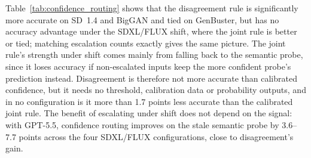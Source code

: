 \documentclass{ieeeaccess}
\begin{document}
\begin{table}[h]
\centering
\footnotesize
\setlength{\tabcolsep}{2pt}
\caption{Disagreement versus joint confidence routing: accuracy (escalation rate). $\Delta$: confidence minus disagreement, with 95\% CI; $^\ast$ CI excludes zero.}
\label{tab:confidence_routing}
\end{table}

Table~\ref{tab:confidence_routing} shows that the disagreement rule is significantly more accurate on SD~1.4 and BigGAN and tied on GenBuster, but has no accuracy advantage under the SDXL/FLUX shift, where the joint rule is better or tied; matching escalation counts exactly gives the same picture. The joint rule's strength under shift comes mainly from falling back to the semantic probe, since it loses accuracy if non-escalated inputs keep the more confident probe's prediction instead. Disagreement is therefore not more accurate than calibrated confidence, but it needs no threshold, calibration data or probability outputs, and in no configuration is it more than 1.7 points less accurate than the calibrated joint rule. The benefit of escalating under shift does not depend on the signal: with GPT-5.5, confidence routing improves on the stale semantic probe by 3.6--7.7 points across the four SDXL/FLUX configurations, close to disagreement's gain.
\end{document}
